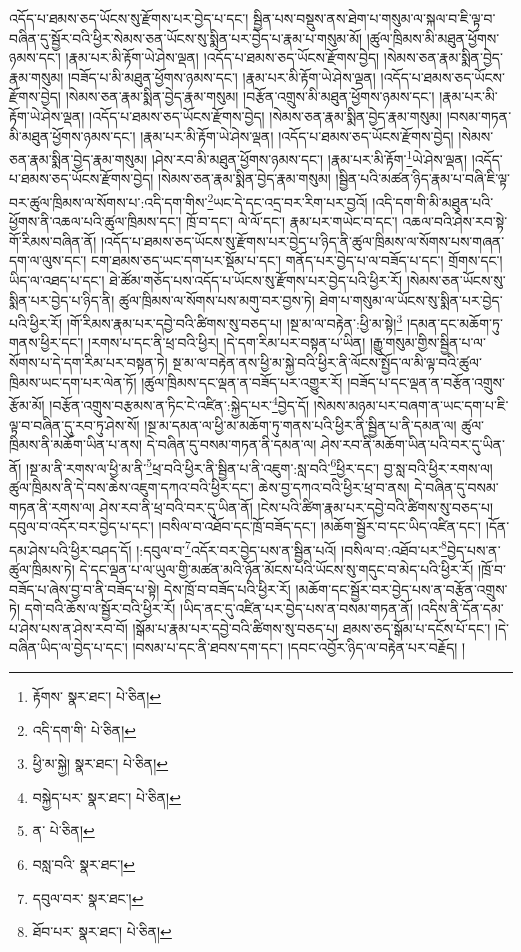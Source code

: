 འདོད་པ་ཐམས་ཅད་ཡོངས་སུ་རྫོགས་པར་བྱེད་པ་དང་། སྦྱིན་པས་བསྡུས་ནས་ཐེག་པ་གསུམ་ལ་སྐལ་བ་ཇི་ལྟ་བ་བཞིན་དུ་སྦྱོར་བའི་ཕྱིར་སེམས་ཅན་ཡོངས་སུ་སྨིན་པར་བྱེད་པ་རྣམ་པ་གསུམ་མོ། །ཚུལ་ཁྲིམས་མི་མཐུན་ཕྱོགས་ཉམས་དང་། །རྣམ་པར་མི་རྟོག་ཡེ་ཤེས་ལྡན། །འདོད་པ་ཐམས་ཅད་ཡོངས་རྫོགས་བྱེད། །སེམས་ཅན་རྣམ་སྨིན་བྱེད་རྣམ་གསུམ། །བཟོད་པ་མི་མཐུན་ཕྱོགས་ཉམས་དང་། །རྣམ་པར་མི་རྟོག་ཡེ་ཤེས་ལྡན། །འདོད་པ་ཐམས་ཅད་ཡོངས་རྫོགས་བྱེད། །སེམས་ཅན་རྣམ་སྨིན་བྱེད་རྣམ་གསུམ། །བརྩོན་འགྲུས་མི་མཐུན་ཕྱོགས་ཉམས་དང་། །རྣམ་པར་མི་རྟོག་ཡེ་ཤེས་ལྡན། །འདོད་པ་ཐམས་ཅད་ཡོངས་རྫོགས་བྱེད། །སེམས་ཅན་རྣམ་སྨིན་བྱེད་རྣམ་གསུམ། །བསམ་གཏན་མི་མཐུན་ཕྱོགས་ཉམས་དང་། །རྣམ་པར་མི་རྟོག་ཡེ་ཤེས་ལྡན། །འདོད་པ་ཐམས་ཅད་ཡོངས་རྫོགས་བྱེད། །སེམས་ཅན་རྣམ་སྨིན་བྱེད་རྣམ་གསུམ། །ཤེས་རབ་མི་མཐུན་ཕྱོགས་ཉམས་དང་། །རྣམ་པར་མི་རྟོག་\footnote{རྟོགས་  སྣར་ཐང་།  པེ་ཅིན། }ཡེ་ཤེས་ལྡན། །འདོད་པ་ཐམས་ཅད་ཡོངས་རྫོགས་བྱེད། །སེམས་ཅན་རྣམ་སྨིན་བྱེད་རྣམ་གསུམ། །སྦྱིན་པའི་མཚན་ཉིད་རྣམ་པ་བཞི་ཇི་ལྟ་བར་ཚུལ་ཁྲིམས་ལ་སོགས་པ་:འདི་དག་གིས་\footnote{འདི་དག་གི་  པེ་ཅིན། }ཡང་དེ་དང་འདྲ་བར་རིག་པར་བྱའོ། །འདི་དག་གི་མི་མཐུན་པའི་ཕྱོགས་ནི་འཆལ་པའི་ཚུལ་ཁྲིམས་དང་། ཁྲོ་བ་དང་། ལེ་ལོ་དང་། རྣམ་པར་གཡེང་བ་དང་། འཆལ་བའི་ཤེས་རབ་སྟེ་གོ་རིམས་བཞིན་ནོ། །འདོད་པ་ཐམས་ཅད་ཡོངས་སུ་རྫོགས་པར་བྱེད་པ་ཉིད་ནི་ཚུལ་ཁྲིམས་ལ་སོགས་པས་གཞན་དག་ལ་ལུས་དང་། ངག་ཐམས་ཅད་ཡང་དག་པར་སྡོམ་པ་དང་། གནོད་པར་བྱེད་པ་ལ་བཟོད་པ་དང་། གྲོགས་དང་། ཡིད་ལ་འཐད་པ་དང་། ཐེ་ཚོམ་གཅོད་པས་འདོད་པ་ཡོངས་སུ་རྫོགས་པར་བྱེད་པའི་ཕྱིར་རོ། །སེམས་ཅན་ཡོངས་སུ་སྨིན་པར་བྱེད་པ་ཉིད་ནི། ཚུལ་ཁྲིམས་ལ་སོགས་པས་མགུ་བར་བྱས་ཏེ། ཐེག་པ་གསུམ་ལ་ཡོངས་སུ་སྨིན་པར་བྱེད་པའི་ཕྱིར་རོ། །གོ་རིམས་རྣམ་པར་དབྱེ་བའི་ཚིགས་སུ་བཅད་པ། །སྔ་མ་ལ་བརྟེན་:ཕྱི་མ་སྟེ།\footnote{ཕྱི་མ་སྐྱེ།  སྣར་ཐང་།  པེ་ཅིན། } །དམན་དང་མཆོག་ཏུ་གནས་ཕྱིར་དང་། །རགས་པ་དང་ནི་ཕྲ་བའི་ཕྱིར། །དེ་དག་རིམ་པར་བསྟན་པ་ཡིན། །རྒྱུ་གསུམ་གྱིས་སྦྱིན་པ་ལ་སོགས་པ་དེ་དག་རིམ་པར་བསྟན་ཏེ། སྔ་མ་ལ་བརྟེན་ནས་ཕྱི་མ་སྐྱེ་བའི་ཕྱིར་ནི་ལོངས་སྤྱོད་ལ་མི་ལྟ་བའི་ཚུལ་ཁྲིམས་ཡང་དག་པར་ལེན་ཏོ། །ཚུལ་ཁྲིམས་དང་ལྡན་ན་བཟོད་པར་འགྱུར་རོ། །བཟོད་པ་དང་ལྡན་ན་བརྩོན་འགྲུས་རྩོམ་མོ། །བརྩོན་འགྲུས་བརྩམས་ན་ཏིང་ངེ་འཛིན་:སྐྱེད་པར་\footnote{བསྐྱེད་པར་  སྣར་ཐང་།  པེ་ཅིན། }བྱེད་དོ། །སེམས་མཉམ་པར་བཞག་ན་ཡང་དག་པ་ཇི་ལྟ་བ་བཞིན་དུ་རབ་ཏུ་ཤེས་སོ། །སྔ་མ་དམན་ལ་ཕྱི་མ་མཆོག་ཏུ་གནས་པའི་ཕྱིར་ནི་སྦྱིན་པ་ནི་དམན་ལ། ཚུལ་ཁྲིམས་ནི་མཆོག་ཡིན་པ་ནས། དེ་བཞིན་དུ་བསམ་གཏན་ནི་དམན་ལ། ཤེས་རབ་ནི་མཆོག་ཡིན་པའི་བར་དུ་ཡིན་ནོ། །སྔ་མ་ནི་རགས་ལ་ཕྱི་མ་ནི་\footnote{ན་  པེ་ཅིན། }ཕྲ་བའི་ཕྱིར་ནི་སྦྱིན་པ་ནི་འཇུག་:སླ་བའི་\footnote{བསླ་བའི་  སྣར་ཐང་། }ཕྱིར་དང་། བྱ་སླ་བའི་ཕྱིར་རགས་ལ། ཚུལ་ཁྲིམས་ནི་དེ་བས་ཆེས་འཇུག་དཀའ་བའི་ཕྱིར་དང་། ཆེས་བྱ་དཀའ་བའི་ཕྱིར་ཕྲ་བ་ནས། དེ་བཞིན་དུ་བསམ་གཏན་ནི་རགས་ལ། ཤེས་རབ་ནི་ཕྲ་བའི་བར་དུ་ཡིན་ནོ། །ངེས་པའི་ཚིག་རྣམ་པར་དབྱེ་བའི་ཚིགས་སུ་བཅད་པ། དབུལ་བ་འདོར་བར་བྱེད་པ་དང་། །བསིལ་བ་འཐོབ་དང་ཁྲོ་བཟོད་དང་། །མཆོག་སྦྱོར་བ་དང་ཡིད་འཛིན་དང་། །དོན་དམ་ཤེས་པའི་ཕྱིར་བཤད་དོ། །:དབུལ་བ་\footnote{དབུལ་བར་  སྣར་ཐང་། }འདོར་བར་བྱེད་པས་ན་སྦྱིན་པའོ། །བསིལ་བ་:འཐོབ་པར་\footnote{ཐོབ་པར་  སྣར་ཐང་།  པེ་ཅིན། }བྱེད་པས་ན་ཚུལ་ཁྲིམས་ཏེ། དེ་དང་ལྡན་པ་ལ་ཡུལ་གྱི་མཚན་མའི་ཉོན་མོངས་པའི་ཡོངས་སུ་གདུང་བ་མེད་པའི་ཕྱིར་རོ། །ཁྲོ་བ་བཟོད་པ་ཞེས་བྱ་བ་ནི་བཟོད་པ་སྟེ། དེས་ཁྲོ་བ་བཟོད་པའི་ཕྱིར་རོ། །མཆོག་དང་སྦྱོར་བར་བྱེད་པས་ན་བརྩོན་འགྲུས་ཏེ། དགེ་བའི་ཆོས་ལ་སྦྱོར་བའི་ཕྱིར་རོ། །ཡིད་ནང་དུ་འཛིན་པར་བྱེད་པས་ན་བསམ་གཏན་ནོ། །འདིས་ནི་དོན་དམ་པ་ཤེས་པས་ན་ཤེས་རབ་བོ། །སྒོམ་པ་རྣམ་པར་དབྱེ་བའི་ཚིགས་སུ་བཅད་པ། ཐམས་ཅད་སྒོམ་པ་དངོས་པོ་དང་། །དེ་བཞིན་ཡིད་ལ་བྱེད་པ་དང་། །བསམ་པ་དང་ནི་ཐབས་དག་དང་། །དབང་འབྱོར་ཉིད་ལ་བརྟེན་པར་བརྗོད། །
